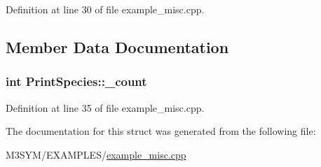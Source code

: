 Definition at line 30 of file example\+\_\+misc.\+cpp.



\subsection{Member Data Documentation}
\hypertarget{structPrintSpecies_a80f72f29171978030df3a06bec02247a}{
\subsubsection[{\+\_\+count}]{\setlength{\rightskip}{0pt plus 5cm}int Print\+Species\+::\+\_\+count}}\label{structPrintSpecies_a80f72f29171978030df3a06bec02247a}


Definition at line 35 of file example\+\_\+misc.\+cpp.



The documentation for this struct was generated from the following file\+:\begin{DoxyCompactItemize}
\item 
M3\+S\+Y\+M/\+E\+X\+A\+M\+P\+L\+E\+S/\hyperlink{example__misc_8cpp}{example\+\_\+misc.\+cpp}\end{DoxyCompactItemize}
